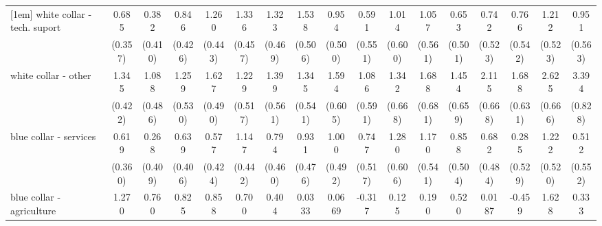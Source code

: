 {\begin{tabular}{l*{16}{c}}
[1em]
white collar - tech. suport&       0.685         &       0.382         &       0.846\sym{*}  &       1.260\sym{**} &       1.336\sym{**} &       1.323\sym{**} &       1.538\sym{**} &       0.954         &       0.591         &       1.014         &       1.057         &       0.653         &       0.742         &       0.766         &       1.212\sym{*}  &       0.951         \\
                    &     (0.357)         &     (0.410)         &     (0.426)         &     (0.443)         &     (0.457)         &     (0.469)         &     (0.506)         &     (0.500)         &     (0.551)         &     (0.600)         &     (0.561)         &     (0.501)         &     (0.523)         &     (0.542)         &     (0.523)         &     (0.563)         \\
[1em]
white collar - other&       1.345\sym{**} &       1.088\sym{*}  &       1.259\sym{*}  &       1.627\sym{***}&       1.229\sym{*}  &       1.399\sym{*}  &       1.345\sym{*}  &       1.594\sym{**} &       1.086         &       1.342\sym{*}  &       1.688\sym{*}  &       1.454\sym{*}  &       2.115\sym{**} &       1.688\sym{**} &       2.625\sym{***}&       3.394\sym{***}\\
                    &     (0.422)         &     (0.486)         &     (0.530)         &     (0.490)         &     (0.517)         &     (0.561)         &     (0.541)         &     (0.605)         &     (0.591)         &     (0.668)         &     (0.681)         &     (0.659)         &     (0.668)         &     (0.631)         &     (0.666)         &     (0.828)         \\
[1em]
blue collar - services&       0.619         &       0.268         &       0.639         &       0.577         &       1.147\sym{**} &       0.794         &       0.931         &       1.000\sym{*}  &       0.747         &       1.280\sym{*}  &       1.170\sym{*}  &       0.858         &       0.682         &       0.285         &       1.222\sym{*}  &       0.512         \\
                    &     (0.360)         &     (0.409)         &     (0.406)         &     (0.424)         &     (0.442)         &     (0.460)         &     (0.476)         &     (0.492)         &     (0.517)         &     (0.606)         &     (0.541)         &     (0.504)         &     (0.484)         &     (0.529)         &     (0.520)         &     (0.552)         \\
[1em]
blue collar - agriculture&       1.270\sym{*}  &       0.760         &       0.825         &       0.858         &       0.700         &       0.404         &      0.0333         &      0.0669         &      -0.317         &       0.125         &       0.190         &       0.520         &      0.0187         &      -0.459         &       1.628\sym{*}  &       0.333         \\

\end{tabular}}
